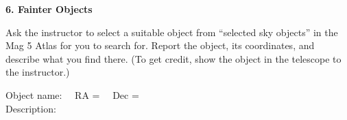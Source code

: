 \documentclass[12pt]{article}
\begin{document}
\bigskip\noindent
{\bf 6. Fainter Objects}

\bigskip\noindent
Ask the instructor to select a suitable object from ``selected sky
objects'' in the Mag 5 Atlas for you to search for. Report the object,
its coordinates, and describe what you find there. (To get credit,
show the object in the telescope to the instructor.)

\bigskip \begin{center}
Object name: \makebox[2cm]{\hrulefill}\ \  RA = \makebox[2cm]{\hrulefill}
\ \ Dec = \makebox[2cm]{\hrulefill} \\ 
Description: \makebox[9cm]{\hrulefill}     
\end{center}
\end{document}
